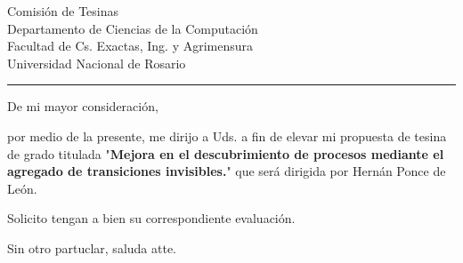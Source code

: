 \documentclass{letter}
\date{Rosario, \today}
\begin{document}
\begin{letter}{Comisi\'on de Tesinas \\ Departamento de Ciencias de la Computaci\'on \\ Facultad de Cs. Exactas, Ing. y Agrimensura \\ Universidad Nacional de Rosario \\ \rule{7.5cm}{0.1pt}}

\opening{De mi mayor consideraci\'on, }
\setlength{\parindent}{4em}
\setlength{\parskip}{1em}
por medio de la presente, me dirijo a Uds. a fin de elevar mi propuesta de tesina de grado titulada "\textbf{Mejora en el descubrimiento de procesos mediante el agregado de transiciones invisibles.}" que ser\'a dirigida por Hern\'an Ponce de Le\'on. 

Solicito tengan a bien su correspondiente evaluaci\'on.

\closing{Sin otro partuclar, saluda atte.}
\end{letter}
\end{document}
